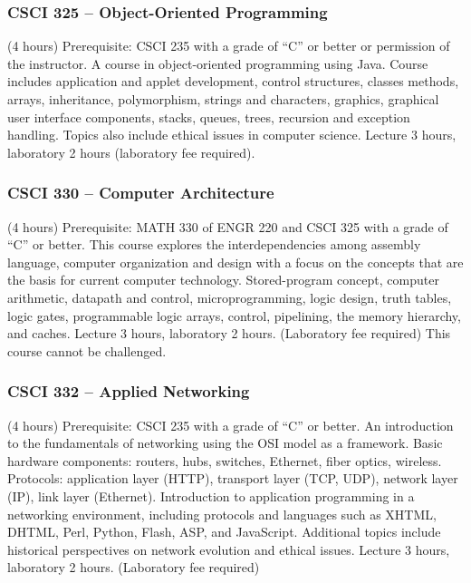 \subsubsection{CSCI 325 -- Object-Oriented Programming}%
\label{course:CSCI:325}
(4 hours) Prerequisite: CSCI 235 with a grade of “C” or better or permission of the instructor. A course in object-oriented programming using Java. Course includes application and applet development, control structures, classes methods, arrays, inheritance, polymorphism, strings and characters, graphics, graphical user interface components, stacks, queues, trees, recursion and exception handling. Topics also include ethical issues in computer science. Lecture 3 hours, laboratory 2 hours (laboratory fee required).

\subsubsection{CSCI 330 -- Computer Architecture}%
\label{course:CSCI:330}
(4 hours) Prerequisite: MATH 330 of ENGR 220 and CSCI 325 with a grade of “C” or better. This course explores the interdependencies among assembly language, computer organization and design with a focus on the concepts that are the basis for current computer technology. Stored-program concept, computer arithmetic, datapath and control, microprogramming, logic design, truth tables, logic gates, programmable logic arrays, control, pipelining, the memory hierarchy, and caches. Lecture 3 hours, laboratory 2 hours. (Laboratory fee required) This course cannot be challenged.

\subsubsection{CSCI 332 -- Applied Networking}%
\label{course:CSCI:332}
(4 hours) Prerequisite: CSCI 235 with a grade of “C” or better. An introduction to the fundamentals of networking using the OSI model as a framework. Basic hardware components: routers, hubs, switches, Ethernet, fiber optics, wireless. Protocols: application layer (HTTP), transport layer (TCP, UDP), network layer (IP), link layer (Ethernet). Introduction to application programming in a networking environment, including protocols and languages such as XHTML, DHTML, Perl, Python, Flash, ASP, and JavaScript. Additional topics include historical perspectives on network evolution and ethical issues. Lecture 3 hours, laboratory 2 hours. (Laboratory fee required)


